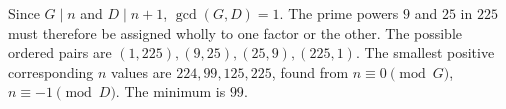Since $G\mid n$ and $D\mid n+1$, $\gcd(G,D)=1$. The prime powers $9$ and $25$ in $225$ must therefore be assigned wholly to one factor or the other. The possible ordered pairs are $(1,225),(9,25),(25,9),(225,1)$. The smallest positive corresponding $n$ values are $224,99,125,225$, found from $n\equiv0\pmod G$, $n\equiv-1\pmod D$. The minimum is $\boxed{99}$.
